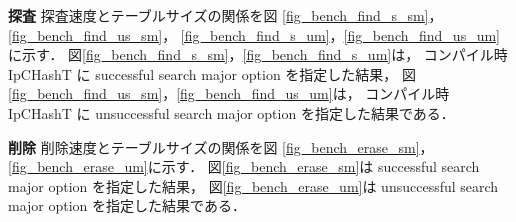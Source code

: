 %
{\bf 探査}
\samepage\newline\indent
探査速度とテーブルサイズの関係を図
\ref{fig_bench_find_s_sm}，\ref{fig_bench_find_us_sm}，
\ref{fig_bench_find_s_um}，\ref{fig_bench_find_us_um}に示す．
図\ref{fig_bench_find_s_sm}，\ref{fig_bench_find_s_um}は，
コンパイル時 IpCHashT に successful search major option を指定した結果，
図\ref{fig_bench_find_us_sm}，\ref{fig_bench_find_us_um}は，
コンパイル時 IpCHashT に unsuccessful search major option を指定した結果である．
\leavevmode \newline

%
{\bf 削除}
\samepage\newline\indent
削除速度とテーブルサイズの関係を図
\ref{fig_bench_erase_sm}，
\ref{fig_bench_erase_um}に示す．
図\ref{fig_bench_erase_sm}は successful search major option を指定した結果，
図\ref{fig_bench_erase_um}は unsuccessful search major option を指定した結果である．
\leavevmode \newline







